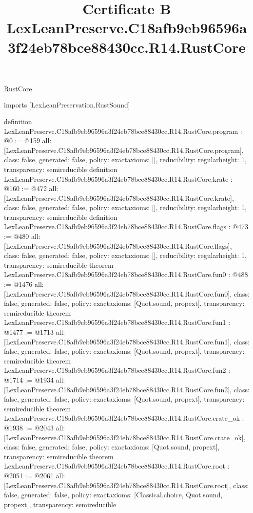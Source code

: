 \begin{lexlean}{RustCore}
\title{Certificate B LexLeanPreserve.C18afb9eb96596a3f24eb78bce88430cc.R14.RustCore}
\begin{coremodule}
imports [LexLeanPreservation.RustSound]

definition LexLeanPreserve.C18afb9eb96596a3f24eb78bce88430cc.R14.RustCore.program : @0 := @159 {
  all: [LexLeanPreserve.C18afb9eb96596a3f24eb78bce88430cc.R14.RustCore.program],
  class: false,
  generated: false,
  policy: exact{axioms: []},
  reducibility: regular{height: 1},
  transparency: semireducible
}
definition LexLeanPreserve.C18afb9eb96596a3f24eb78bce88430cc.R14.RustCore.krate : @160 := @472 {
  all: [LexLeanPreserve.C18afb9eb96596a3f24eb78bce88430cc.R14.RustCore.krate],
  class: false,
  generated: false,
  policy: exact{axioms: []},
  reducibility: regular{height: 1},
  transparency: semireducible
}
definition LexLeanPreserve.C18afb9eb96596a3f24eb78bce88430cc.R14.RustCore.flags : @473 := @480 {
  all: [LexLeanPreserve.C18afb9eb96596a3f24eb78bce88430cc.R14.RustCore.flags],
  class: false,
  generated: false,
  policy: exact{axioms: []},
  reducibility: regular{height: 1},
  transparency: semireducible
}
theorem LexLeanPreserve.C18afb9eb96596a3f24eb78bce88430cc.R14.RustCore.fun0 : @488 := @1476 {
  all: [LexLeanPreserve.C18afb9eb96596a3f24eb78bce88430cc.R14.RustCore.fun0],
  class: false,
  generated: false,
  policy: exact{axioms: [Quot.sound, propext]},
  transparency: semireducible
}
theorem LexLeanPreserve.C18afb9eb96596a3f24eb78bce88430cc.R14.RustCore.fun1 : @1477 := @1713 {
  all: [LexLeanPreserve.C18afb9eb96596a3f24eb78bce88430cc.R14.RustCore.fun1],
  class: false,
  generated: false,
  policy: exact{axioms: [Quot.sound, propext]},
  transparency: semireducible
}
theorem LexLeanPreserve.C18afb9eb96596a3f24eb78bce88430cc.R14.RustCore.fun2 : @1714 := @1934 {
  all: [LexLeanPreserve.C18afb9eb96596a3f24eb78bce88430cc.R14.RustCore.fun2],
  class: false,
  generated: false,
  policy: exact{axioms: [Quot.sound, propext]},
  transparency: semireducible
}
theorem LexLeanPreserve.C18afb9eb96596a3f24eb78bce88430cc.R14.RustCore.crate_ok : @1938 := @2043 {
  all: [LexLeanPreserve.C18afb9eb96596a3f24eb78bce88430cc.R14.RustCore.crate_ok],
  class: false,
  generated: false,
  policy: exact{axioms: [Quot.sound, propext]},
  transparency: semireducible
}
theorem LexLeanPreserve.C18afb9eb96596a3f24eb78bce88430cc.R14.RustCore.root : @2051 := @2061 {
  all: [LexLeanPreserve.C18afb9eb96596a3f24eb78bce88430cc.R14.RustCore.root],
  class: false,
  generated: false,
  policy: exact{axioms: [Classical.choice, Quot.sound, propext]},
  transparency: semireducible
}


\end{coremodule}
\end{lexlean}
